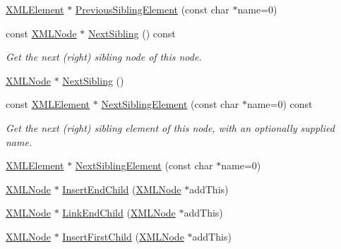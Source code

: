 \begin{DoxyCompactItemize}
\mbox{\hyperlink{classtinyxml2_1_1_x_m_l_element}{X\+M\+L\+Element}} $\ast$ \mbox{\hyperlink{classtinyxml2_1_1_x_m_l_node_ae4f37eb6cd405bdf1d57caa066e36d87}{Previous\+Sibling\+Element}} (const char $\ast$name=0)
\item 
const \mbox{\hyperlink{classtinyxml2_1_1_x_m_l_node}{X\+M\+L\+Node}} $\ast$ \mbox{\hyperlink{classtinyxml2_1_1_x_m_l_node_a79db9ef0fe014d27790f2218b87bcbb5}{Next\+Sibling}} () const
\begin{DoxyCompactList}\small\item\em Get the next (right) sibling node of this node. \end{DoxyCompactList}\item 
\mbox{\hyperlink{classtinyxml2_1_1_x_m_l_node}{X\+M\+L\+Node}} $\ast$ \mbox{\hyperlink{classtinyxml2_1_1_x_m_l_node_aeb7d4dfd8fb924ef86e7cb72183acbac}{Next\+Sibling}} ()
\item 
const \mbox{\hyperlink{classtinyxml2_1_1_x_m_l_element}{X\+M\+L\+Element}} $\ast$ \mbox{\hyperlink{classtinyxml2_1_1_x_m_l_node_a14ea560df31110ff07a9f566171bf797}{Next\+Sibling\+Element}} (const char $\ast$name=0) const
\begin{DoxyCompactList}\small\item\em Get the next (right) sibling element of this node, with an optionally supplied name. \end{DoxyCompactList}\item 
\mbox{\hyperlink{classtinyxml2_1_1_x_m_l_element}{X\+M\+L\+Element}} $\ast$ \mbox{\hyperlink{classtinyxml2_1_1_x_m_l_node_af1225412584d4a2126f55e96a12e0ec0}{Next\+Sibling\+Element}} (const char $\ast$name=0)
\item 
\mbox{\hyperlink{classtinyxml2_1_1_x_m_l_node}{X\+M\+L\+Node}} $\ast$ \mbox{\hyperlink{classtinyxml2_1_1_x_m_l_node_ae3b422e98914d6002ca99bb1d2837103}{Insert\+End\+Child}} (\mbox{\hyperlink{classtinyxml2_1_1_x_m_l_node}{X\+M\+L\+Node}} $\ast$add\+This)
\item 
\mbox{\hyperlink{classtinyxml2_1_1_x_m_l_node}{X\+M\+L\+Node}} $\ast$ \mbox{\hyperlink{classtinyxml2_1_1_x_m_l_node_a663e3a5a378169fd477378f4d17a7649}{Link\+End\+Child}} (\mbox{\hyperlink{classtinyxml2_1_1_x_m_l_node}{X\+M\+L\+Node}} $\ast$add\+This)
\item 
\mbox{\hyperlink{classtinyxml2_1_1_x_m_l_node}{X\+M\+L\+Node}} $\ast$ \mbox{\hyperlink{classtinyxml2_1_1_x_m_l_node_ac609a8f3ea949027f439280c640bbaf2}{Insert\+First\+Child}} (\mbox{\hyperlink{classtinyxml2_1_1_x_m_l_node}{X\+M\+L\+Node}} $\ast$add\+This)
\item 

\end{DoxyCompactItemize}
